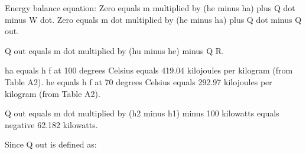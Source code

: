 Energy balance equation:  
Zero equals m multiplied by (he minus ha) plus Q dot minus W dot.  
Zero equals m dot multiplied by (he minus ha) plus Q dot minus Q out.  

Q out equals m dot multiplied by (hu minus he) minus Q R.  

ha equals h f at 100 degrees Celsius equals 419.04 kilojoules per kilogram (from Table A2).  
he equals h f at 70 degrees Celsius equals 292.97 kilojoules per kilogram (from Table A2).  

Q out equals m dot multiplied by (h2 minus h1) minus 100 kilowatts equals negative 62.182 kilowatts.  

Since Q out is defined as: